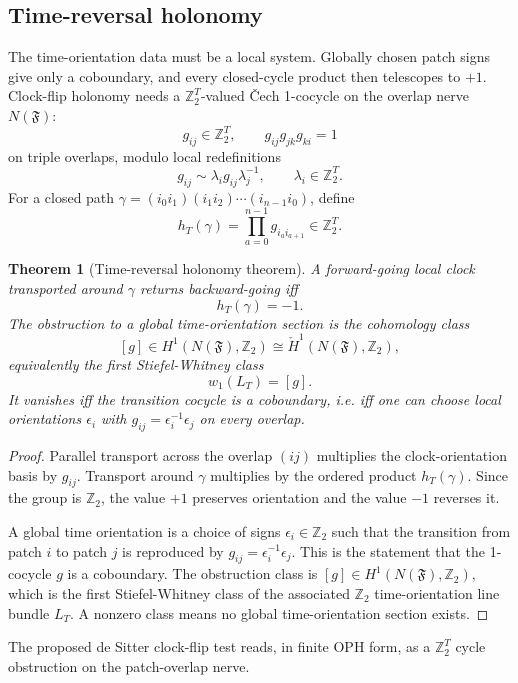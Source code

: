 \documentclass[11pt]{article}
\newtheorem{theorem}{Theorem}[section]
\theoremstyle{remark}
\theoremstyle{plain}
\newcommand{\Z}{\mathbb Z}
\begin{document}
\subsection{Time-reversal holonomy}

The time-orientation data must be a local system. Globally chosen patch signs give only a
coboundary, and every closed-cycle product then telescopes to \(+1\). Clock-flip holonomy needs a
\(\Z_2^T\)-valued \v{C}ech 1-cocycle on the overlap nerve \(N(\mathfrak F)\):
\[
g_{ij}\in \Z_2^T,\qquad g_{ij}g_{jk}g_{ki}=1
\]
on triple overlaps, modulo local redefinitions
\[
g_{ij}\sim \lambda_i g_{ij}\lambda_j^{-1},\qquad \lambda_i\in\Z_2^T.
\]
For a closed path \(\gamma=(i_0i_1)(i_1i_2)\cdots(i_{n-1}i_0)\), define
\[
h_T(\gamma)=\prod_{a=0}^{n-1}g_{i_a i_{a+1}}\in\Z_2^T.
\]

\begin{theorem}[Time-reversal holonomy theorem]
A forward-going local clock transported around \(\gamma\) returns backward-going iff
\[
h_T(\gamma)=-1.
\]
The obstruction to a global time-orientation section is the cohomology class
\[
[g]\in H^1(N(\mathfrak F),\Z_2)\cong \check H^1(N(\mathfrak F),\Z_2),
\]
equivalently the first Stiefel-Whitney class
\[
w_1(L_T)=[g].
\]
It vanishes iff the transition cocycle is a coboundary, i.e. iff one can choose local orientations
\(\epsilon_i\) with \(g_{ij}=\epsilon_i^{-1}\epsilon_j\) on every overlap.
\end{theorem}

\begin{proof}
Parallel transport across the overlap \((ij)\) multiplies the clock-orientation basis by \(g_{ij}\).
Transport around \(\gamma\) multiplies by the ordered product \(h_T(\gamma)\). Since the group is
\(\Z_2\), the value \(+1\) preserves orientation and the value \(-1\) reverses it.

A global time orientation is a choice of signs \(\epsilon_i\in\Z_2\) such that the transition from
patch \(i\) to patch \(j\) is reproduced by \(g_{ij}=\epsilon_i^{-1}\epsilon_j\). This is the
statement that the 1-cocycle \(g\) is a coboundary. The obstruction class is
\([g]\in H^1(N(\mathfrak F),\Z_2)\), which is the first Stiefel-Whitney class of the associated
\(\Z_2\) time-orientation line bundle \(L_T\). A nonzero class means no global time-orientation
section exists.
\end{proof}

The proposed de Sitter clock-flip test reads, in finite OPH form, as a \(\Z_2^T\) cycle obstruction
on the patch-overlap nerve.
\end{document}

